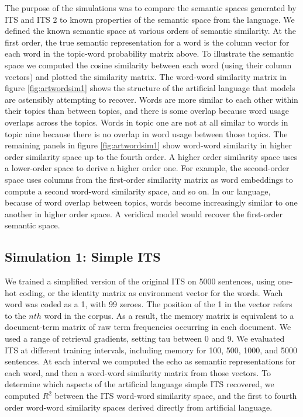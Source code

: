 \documentclass[
  jou]{apa6}
\begin{document}
The purpose of the simulations was to compare the semantic spaces generated by ITS and ITS 2 to known properties of the semantic space from the language. We defined the known semantic space at various orders of semantic similarity. At the first order, the true semantic representation for a word is the column vector for each word in the topic-word probability matrix above. To illustrate the semantic space we computed the cosine similarity between each word (using their column vectors) and plotted the similarity matrix. The word-word similarity matrix in figure \ref{fig:artwordsim1} shows the structure of the artificial language that models are ostensibly attempting to recover. Words are more similar to each other within their topics than between topics, and there is some overlap because word usage overlaps across the topics. Words in topic one are not at all similar to words in topic nine because there is no overlap in word usage between those topics. The remaining panels in figure \ref{fig:artwordsim1} show word-word similarity in higher order similarity space up to the fourth order. A higher order similarity space uses a lower-order space to derive a higher order one. For example, the second-order space uses columns from the first-order similarity matrix as word embeddings to compute a second word-word similarity space, and so on. In our language, because of word overlap between topics, words become increasingly similar to one another in higher order space. A veridical model would recover the first-order semantic space.

\hypertarget{simulation-1-simple-its}{%
\subsection{Simulation 1: Simple ITS}\label{simulation-1-simple-its}}

We trained a simplified version of the original ITS on 5000 sentences, using one-hot coding, or the identity matrix as environment vector for the words. Wach word was coded as a 1, with 99 zeroes. The position of the 1 in the vector refers to the \(nth\) word in the corpus. As a result, the memory matrix is equivalent to a document-term matrix of raw term frequencies occurring in each document. We used a range of retrieval gradients, setting tau between 0 and 9. We evaluated ITS at different training intervals, including memory for 100, 500, 1000, and 5000 sentences. At each interval we computed the echo as semantic representations for each word, and then a word-word similarity matrix from those vectors. To determine which aspects of the artificial language simple ITS recovered, we computed \(R^2\) between the ITS word-word similarity space, and the first to fourth order word-word similarity spaces derived directly from artificial language.
\end{document}
